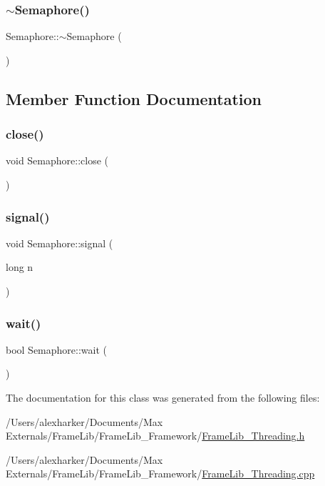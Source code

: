 \subsubsection{\texorpdfstring{$\sim$\+Semaphore()}{~Semaphore()}}
{\footnotesize\ttfamily Semaphore\+::$\sim$\+Semaphore (\begin{DoxyParamCaption}{ }\end{DoxyParamCaption})}



\subsection{Member Function Documentation}
\mbox{\label{class_semaphore_ab04c0934fbf281eb49bd332ecd07c856}} 
\subsubsection{\texorpdfstring{close()}{close()}}
{\footnotesize\ttfamily void Semaphore\+::close (\begin{DoxyParamCaption}{ }\end{DoxyParamCaption})}

\mbox{\label{class_semaphore_adcd7d652d882d0ab4b068070235ef079}} 
\subsubsection{\texorpdfstring{signal()}{signal()}}
{\footnotesize\ttfamily void Semaphore\+::signal (\begin{DoxyParamCaption}\item[{long}]{n }\end{DoxyParamCaption})}

\mbox{\label{class_semaphore_a496aae0d0eceef9385c9dcae4c3d9b36}} 
\subsubsection{\texorpdfstring{wait()}{wait()}}
{\footnotesize\ttfamily bool Semaphore\+::wait (\begin{DoxyParamCaption}{ }\end{DoxyParamCaption})}



The documentation for this class was generated from the following files\+:\begin{DoxyCompactItemize}
\item 
/\+Users/alexharker/\+Documents/\+Max Externals/\+Frame\+Lib/\+Frame\+Lib\+\_\+\+Framework/\hyperlink{_frame_lib___threading_8h}{Frame\+Lib\+\_\+\+Threading.\+h}\item 
/\+Users/alexharker/\+Documents/\+Max Externals/\+Frame\+Lib/\+Frame\+Lib\+\_\+\+Framework/\hyperlink{_frame_lib___threading_8cpp}{Frame\+Lib\+\_\+\+Threading.\+cpp}\end{DoxyCompactItemize}
